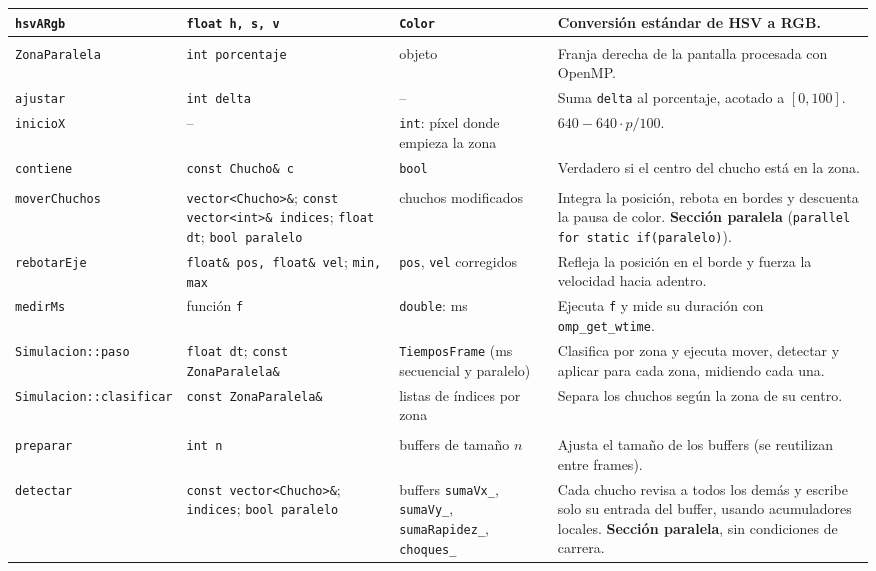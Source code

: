 \documentclass[11pt,letterpaper]{article}
\begin{document}
\begin{longtable}{>{\raggedright}p{3.5cm}>{\raggedright}p{3.7cm}>{\raggedright}p{2.7cm}p{5.0cm}}
\texttt{hsvARgb} & \texttt{float h, s, v} & \texttt{Color} & Conversión estándar de HSV a RGB. \\
\midrule
\multicolumn{4}{l}{\textbf{\texttt{src/zona.cpp}}} \\
\texttt{ZonaParalela} & \texttt{int porcentaje} & objeto & Franja derecha de la pantalla procesada con OpenMP. \\
\texttt{ajustar} & \texttt{int delta} & -- & Suma \texttt{delta} al porcentaje, acotado a $[0,100]$. \\
\texttt{inicioX} & -- & \texttt{int}: píxel donde empieza la zona & $640 - 640\cdot p/100$. \\
\texttt{contiene} & \texttt{const Chucho\& c} & \texttt{bool} & Verdadero si el centro del chucho está en la zona. \\
\midrule
\multicolumn{4}{l}{\textbf{\texttt{src/simulacion.cpp}}} \\
\texttt{moverChuchos} & \texttt{vector<Chucho>\&}; \texttt{const vector<int>\& indices}; \texttt{float dt}; \texttt{bool paralelo} & chuchos modificados & Integra la posición, rebota en bordes y descuenta la pausa de color. \textbf{Sección paralela} (\texttt{parallel for static if(paralelo)}). \\
\texttt{rebotarEje} & \texttt{float\& pos, float\& vel}; \texttt{min, max} & \texttt{pos}, \texttt{vel} corregidos & Refleja la posición en el borde y fuerza la velocidad hacia adentro. \\
\texttt{medirMs} & función \texttt{f} & \texttt{double}: ms & Ejecuta \texttt{f} y mide su duración con \texttt{omp\_get\_wtime}. \\
\texttt{Simulacion::\allowbreak paso} & \texttt{float dt}; \texttt{const ZonaParalela\&} & \texttt{TiemposFrame} (ms secuencial y paralelo) & Clasifica por zona y ejecuta mover, detectar y aplicar para cada zona, midiendo cada una. \\
\texttt{Simulacion::\allowbreak clasificar} & \texttt{const ZonaParalela\&} & listas de índices por zona & Separa los chuchos según la zona de su centro. \\
\midrule
\multicolumn{4}{l}{\textbf{\texttt{src/colisiones.cpp} (\texttt{ManejadorColisiones})}} \\
\texttt{preparar} & \texttt{int n} & buffers de tamaño $n$ & Ajusta el tamaño de los buffers (se reutilizan entre frames). \\
\texttt{detectar} & \texttt{const vector<Chucho>\&}; \texttt{indices}; \texttt{bool paralelo} & buffers \texttt{sumaVx\_}, \texttt{sumaVy\_}, \texttt{sumaRapidez\_}, \texttt{choques\_} & Cada chucho revisa a todos los demás y escribe solo su entrada del buffer, usando acumuladores locales. \textbf{Sección paralela}, sin condiciones de carrera. \\

\end{longtable}
\end{document}
